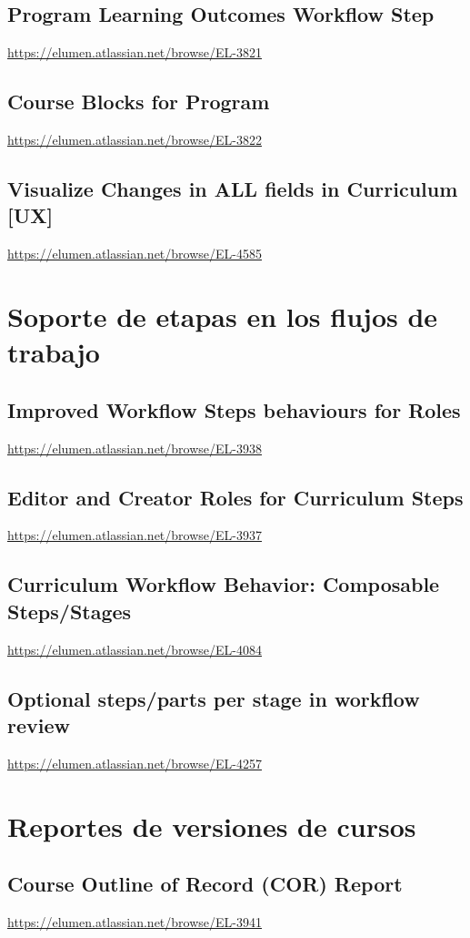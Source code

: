 \subsection{Program Learning Outcomes Workflow Step}
\url{https://elumen.atlassian.net/browse/EL-3821}

\subsection{Course Blocks for Program}
\url{https://elumen.atlassian.net/browse/EL-3822}

\subsection{Visualize Changes in ALL fields in Curriculum [UX]}
\url{https://elumen.atlassian.net/browse/EL-4585}

\section{Soporte de etapas en los flujos de trabajo}
\subsection{Improved Workflow Steps behaviours for Roles}
\url{https://elumen.atlassian.net/browse/EL-3938}

\subsection{Editor and Creator Roles for Curriculum Steps}
\url{https://elumen.atlassian.net/browse/EL-3937}

\subsection{Curriculum Workflow Behavior: Composable Steps/Stages}
\url{https://elumen.atlassian.net/browse/EL-4084}

\subsection{Optional steps/parts per stage in workflow review}
\url{https://elumen.atlassian.net/browse/EL-4257}

\section{Reportes de versiones de cursos}
\subsection{Course Outline of Record (COR) Report}
\url{https://elumen.atlassian.net/browse/EL-3941}

